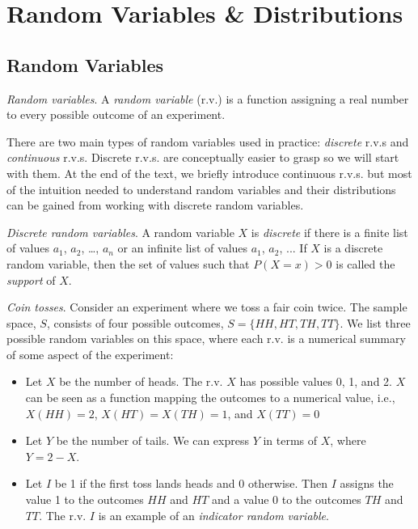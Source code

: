 


\maketitle
\clearpage

\section{Random Variables \& Distributions}

\subsection{Random Variables}

\emph{Random variables}. 
A \emph{random variable} (r.v.) is a function
assigning a real number to every possible outcome of an experiment.

There are two main types of random variables used in practice:
\emph{discrete} r.v.s and \emph{continuous} r.v.s. 
Discrete r.v.s. are conceptually easier to grasp so we will start with them. 
At the end of the text, 
we briefly introduce continuous r.v.s. 
but most of the intuition needed to understand random variables and their distributions
can be gained from working with discrete random variables.

\emph{Discrete random variables}. 
A random variable \(X\) is \emph{discrete} if there is a finite list of values \(a_{1}\),
\(a_{2}\), \ldots, \(a_{n}\) or an infinite list of values \(a_{1}\),
\(a_{2}\), ... If \(X\) is a discrete random variable, then the set of
values such that \(P(X = x) > 0\) is called the \emph{support} of \(X\).

\emph{Coin tosses}. 
Consider an experiment where we toss a fair coin twice. 
The sample space, \(S\), 
consists of four possible outcomes,
\(S = \{HH,HT,TH,TT\}\). 
We list three possible random variables on this space, 
where each r.v. is a numerical summary of some aspect of the
experiment:
\begin{itemize}
\item
Let \(X\) be the number of heads. 
The r.v. \(X\) has possible values 0, 1, and 2. 
\(X\) can be seen as a function mapping the outcomes to a numerical value, 
i.e., \(X(HH) = 2\), \(X(HT) = X(TH) = 1\), and \(X(TT) = 0\)
\item
Let \(Y\) be the number of tails. 
We can express \(Y\) in terms of \(X\), 
where \(Y = 2 - X\).
\item
Let \(I\) be 1 if the first toss lands heads and 0 otherwise. 
Then \(I\) assigns the value 1 to the outcomes \(HH\) and \(HT\) and a
value 0 to the outcomes \(TH\) and \(TT\). 
The r.v. \(I\) is an example of an \emph{indicator random variable}.
\end{itemize}

